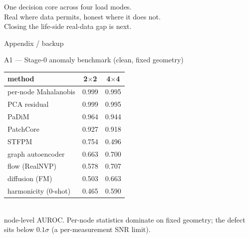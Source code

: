 \documentclass[aspectratio=169,10pt]{beamer}
\begin{document}
\begin{frame}[standout]
  One decision core across four load modes.\\[2mm]
  Real where data permits, honest where it does not.\\[2mm]
  Closing the life-side real-data gap is next.
\end{frame}

\appendix

\begin{frame}[standout]
  Appendix / backup
\end{frame}

\begin{frame}{A1 --- Stage-0 anomaly benchmark (clean, fixed geometry)}
  \centering\small
  \begin{tabular}{@{}lcc@{}}
    \toprule method & 2$\times$2 & 4$\times$4 \\ \midrule
    per-node Mahalanobis & 0.999 & 0.995 \\
    PCA residual         & 0.999 & 0.995 \\
    PaDiM                & 0.964 & 0.944 \\
    PatchCore            & 0.927 & 0.918 \\
    STFPM                & 0.754 & 0.496 \\
    graph autoencoder    & 0.663 & 0.700 \\
    flow (RealNVP)       & 0.578 & 0.707 \\
    diffusion (FM)       & 0.503 & 0.663 \\
    harmonicity (0-shot) & 0.465 & 0.590 \\ \bottomrule
  \end{tabular}\\[1mm]
  \footnotesize node-level AUROC. Per-node statistics dominate on fixed geometry;
  the defect sits below $0.1\sigma$ (a per-measurement SNR limit).
\end{frame}
\end{document}
